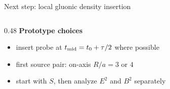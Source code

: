 \documentclass[11pt,rgb,ratio=169]{beamer}
\newcommand{\tightitems}{\setlength\itemsep{0.28em}\setlength\parskip{0pt}}
\begin{document}
\begin{frame}{Next step: local gluonic density insertion}
\begin{columns}[T,totalwidth=\textwidth]
\begin{column}{0.48\textwidth}
\vspace{0.55em}
\textbf{Prototype choices}\vspace{0.2em}

\begin{itemize}\tightitems
  \item insert probe at $t_{\rm mid}=t_0+\tau/2$ where possible
  \item first source pair: on-axis $R/a=3$ or $4$
  \item start with $S$, then analyze $E^2$ and $B^2$ separately
\end{itemize}

\end{column}

\end{columns}
\end{frame}
\end{document}
